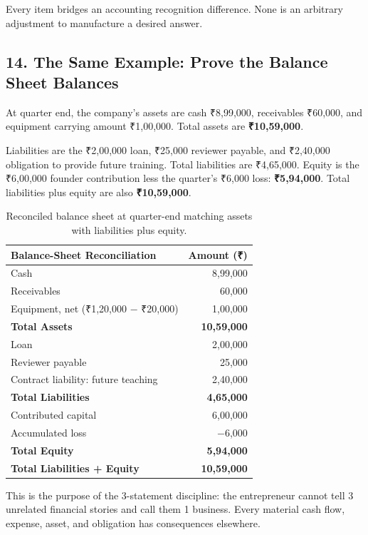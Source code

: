 Every item bridges an accounting recognition difference. None is an arbitrary adjustment to manufacture a desired answer.

\subsection*{14. The Same Example: Prove the Balance Sheet Balances}

At quarter end, the company's assets are cash ₹8,99,000, receivables ₹60,000, and equipment carrying amount ₹1,00,000. Total assets are \textbf{₹10,59,000}.

Liabilities are the ₹2,00,000 loan, ₹25,000 reviewer payable, and ₹2,40,000 obligation to provide future training. Total liabilities are ₹4,65,000. Equity is the ₹6,00,000 founder contribution less the quarter's ₹6,000 loss: \textbf{₹5,94,000}. Total liabilities plus equity are also \textbf{₹10,59,000}.

\begin{table}[htbp]
\centering
\small
\begin{tabularx}{\columnwidth}{Xr}
\toprule
\textbf{Balance-Sheet Reconciliation} & \textbf{Amount (₹)} \\
\midrule
Cash & 8,99,000 \\
Receivables & 60,000 \\
Equipment, net (₹1,20,000 $-$ ₹20,000) & 1,00,000 \\
\midrule
\textbf{Total Assets} & \textbf{10,59,000} \\
\midrule
Loan & 2,00,000 \\
Reviewer payable & 25,000 \\
Contract liability: future teaching & 2,40,000 \\
\midrule
\textbf{Total Liabilities} & \textbf{4,65,000} \\
\midrule
Contributed capital & 6,00,000 \\
Accumulated loss & $-$6,000 \\
\midrule
\textbf{Total Equity} & \textbf{5,94,000} \\
\midrule
\textbf{Total Liabilities + Equity} & \textbf{10,59,000} \\
\bottomrule
\end{tabularx}
\caption{Reconciled balance sheet at quarter-end matching assets with liabilities plus equity.}
\end{table}

This is the purpose of the 3-statement discipline: the entrepreneur cannot tell 3 unrelated financial stories and call them 1 business. Every material cash flow, expense, asset, and obligation has consequences elsewhere.
